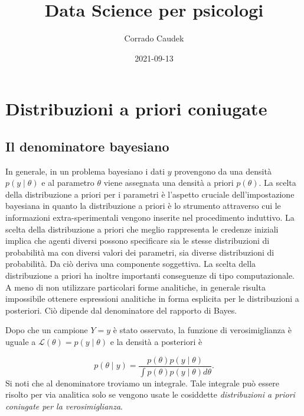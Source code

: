 \documentclass[
]{memoir}
\title{Data Science per psicologi}
\author{Corrado Caudek}
\date{2021-09-13}
\theoremstyle{definition}
\theoremstyle{definition}
\theoremstyle{definition}
\theoremstyle{definition}
\theoremstyle{remark}
\begin{document}
\maketitle

{
\hypersetup{linkcolor=}
\setcounter{tocdepth}{1}
\tableofcontents
}
\newpage

\vspace*{5cm}

\thispagestyle{empty}

\hypertarget{chapter-distr-coniugate}{%
\chapter{Distribuzioni a priori coniugate}\label{chapter-distr-coniugate}}

\hypertarget{il-denominatore-bayesiano}{%
\section{Il denominatore bayesiano}\label{il-denominatore-bayesiano}}

In generale, in un problema bayesiano i dati \(y\) provengono da una densità \(p(y \mid \theta)\) e al parametro \(\theta\) viene assegnata una densità a priori \(p(\theta)\). La scelta della distribuzione a priori per i parametri è l'aspetto cruciale dell'impostazione bayesiana in quanto la distribuzione a priori è lo strumento attraverso cui le informazioni extra-sperimentali vengono inserite nel procedimento induttivo. La scelta della distribuzione a priori che meglio rappresenta le credenze iniziali implica che agenti diversi possono specificare sia le stesse distribuzioni di probabilità ma con diversi valori dei parametri, sia diverse distribuzioni di probabilità. Da ciò deriva una componente soggettiva. La scelta della distribuzione a priori ha inoltre importanti conseguenze di tipo computazionale. A meno di non utilizzare particolari forme analitiche, in generale risulta impossibile ottenere espressioni analitiche in forma esplicita per le distribuzioni a posteriori. Ciò dipende dal denominatore del rapporto di Bayes.

Dopo che un campione \(Y = y\) è stato osservato, la funzione di verosimiglianza è uguale a \(\mathcal{L}(\theta) = p(y \mid \theta)\) e la densità a posteriori è

\[
p(\theta \mid y) = \frac{p(\theta) p(y \mid \theta)}{\int p(\theta) p(y \mid \theta) d \theta}.
\]
Si noti che al denominatore troviamo un integrale. Tale integrale può essere risolto per via analitica solo se vengono usate le cosiddette \emph{distribuzioni a priori coniugate per la verosimiglianza}.
\end{document}
